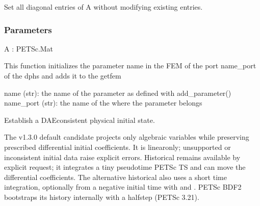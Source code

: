\documentclass[letterpaper,10pt,english]{sphinxmanual}
\begin{document}
\begin{fulllineitems}
\begin{fulllineitems}
\label{\detokenize{scrimp:scrimp.dphs.DPHS.init_matrix}}
\pysigstartsignatures
\pysiglinewithargsret
{}
{}
{}
\pysigstopsignatures
\sphinxAtStartPar
Set all diagonal entries of A without modifying existing entries.


\subsubsection{Parameters}
\label{\detokenize{scrimp:parameters}}
\sphinxAtStartPar
A : PETSc.Mat

\end{fulllineitems}


\begin{fulllineitems}
\label{\detokenize{scrimp:scrimp.dphs.DPHS.init_parameter}}
\pysigstartsignatures
\pysiglinewithargsret
{}
{\sphinxparamcomma {}}
{}
\pysigstopsignatures
\sphinxAtStartPar
This function initializes the parameter name in the FEM of the port name\_port of the dphs and adds it to the getfem 
\begin{description}
\sphinxAtStartPar
name (str): the name of the parameter as defined with add\_parameter()
name\_port (str): the name of the  where the parameter belongs

\end{description}

\end{fulllineitems}


\begin{fulllineitems}
\label{\detokenize{scrimp:scrimp.dphs.DPHS.init_step}}
\pysigstartsignatures
\pysiglinewithargsret
{}
{}
{}
\pysigstopsignatures
\sphinxAtStartPar
Establish a DAE\sphinxhyphen{}consistent physical initial state.

\sphinxAtStartPar
The v1.3.0 default candidate  projects only
algebraic variables while preserving prescribed differential
initial coefficients. It is linear\sphinxhyphen{}only; unsupported or
inconsistent initial data raise explicit errors.
Historical  remains available by explicit request;
it integrates a tiny pseudo\sphinxhyphen{}time PETSc TS and can move the
differential coefficients. The alternative historical
 also uses a short time integration, optionally from a
negative initial time with  and
. PETSc BDF2 bootstraps
its history internally with a half\sphinxhyphen{}step (PETSc 3.21).


\end{fulllineitems}
\end{fulllineitems}
\end{document}
